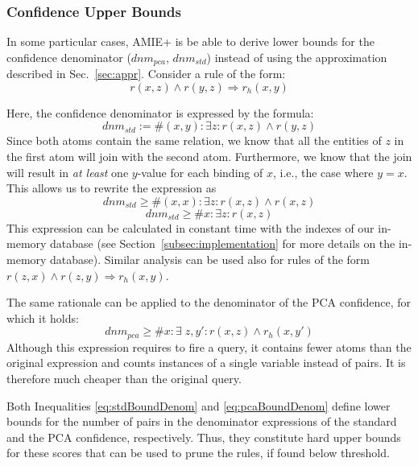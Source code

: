 \subsubsection{Confidence Upper Bounds}
In some particular cases, AMIE+ is be able to derive lower bounds for the confidence denominator ($dnm_{pca}$, $dnm_{std}$) instead of using the approximation described in Sec.~\ref{sec:appr}.
Consider a rule of the form:
$$ r(x,z) \wedge r(y,z) \Rightarrow r_h(x,y) $$

\noindent Here, the confidence denominator is expressed by the formula:
$$
dnm_{std} := \#(x,y): \exists z: r(x,z) \wedge r(y,z)
$$
Since both atoms contain the same relation, we know that all the entities of $z$ in the first atom
will join with the second atom. Furthermore,
we know that the join will result in \emph{at least} one $y$-value for each binding of $x$, i.e., the case where $y=x$. This allows us to rewrite
the expression as
\[
dnm_{std} \ge \#(x,x): \exists z:  r(x,z) \wedge r(x,z)
\]
\begin{equation}
dnm_{std} \ge \#x: \exists z:  r(x,z)  \label{eq:stdBoundDenom}
\end{equation}
This expression can be calculated in constant time with the indexes of our in-memory database (see Section~\ref{subsec:implementation} for more details on the in-memory database).
Similar analysis can be used also for rules of the form $r(z,x) \wedge r(z,y) \Rightarrow r_h(x,y) $.

The same rationale can be applied to the denominator of the PCA confidence, for which it holds:
\begin{equation} \label{eq:pcaBoundDenom}
dnm_{pca} \ge \#x: \exists \;z, y': r(x,z) \wedge r_h(x,y')
\end{equation}
Although this expression requires to fire a query, it contains fewer atoms than the original expression and counts instances
of a single variable instead of pairs. It is therefore much cheaper than the original query.

Both Inequalities \ref{eq:stdBoundDenom} and \ref{eq:pcaBoundDenom}
define lower bounds for the number of pairs in the denominator expressions of the standard
and the PCA confidence, respectively. Thus, they constitute hard upper bounds for these scores that can be used to prune the rules, if found below threshold.








